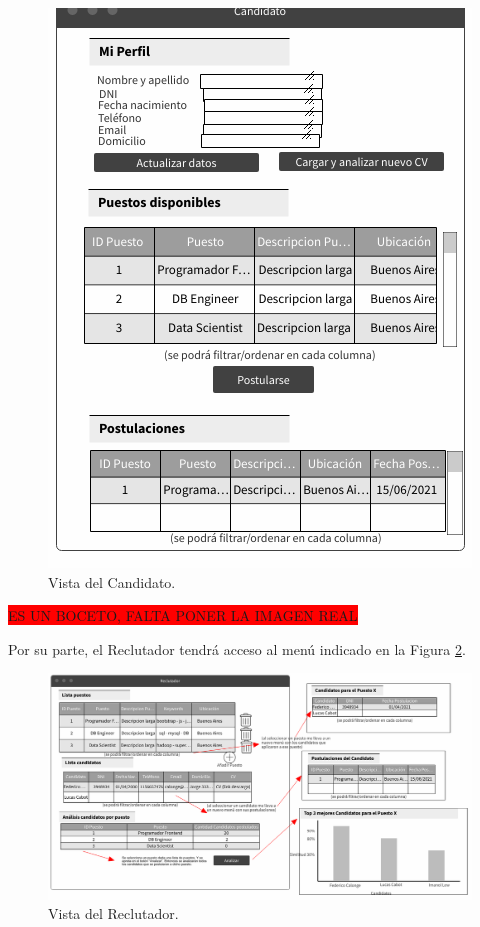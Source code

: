 \documentclass[12pt,a4paper]{article}
\begin{document}
\begin{sloppypar}
\begin{figure}[H]    %
  \centering
  \includegraphics[width=1\textwidth]{images/Vista_Candidato.png}
  \caption{Vista del Candidato.}  
  \label{fig:Vista_Candidato}
\end{figure}

\colorbox{red}{ES UN BOCETO, FALTA PONER LA IMAGEN REAL}

Por su parte, el Reclutador tendrá acceso al menú indicado en la Figura \ref{fig:Vista_Reclutador}. 

\begin{figure}[H]    %
  \centering
  \includegraphics[width=1\textwidth]{images/Vista_Reclutador.png}
  \caption{Vista del Reclutador.}  
  \label{fig:Vista_Reclutador}
\end{figure}


\end{sloppypar}
\end{document}
